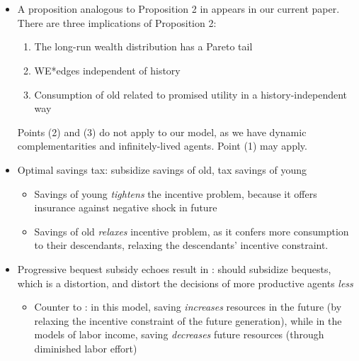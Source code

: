 \documentclass[11pt]{article}
\begin{document}
\section{\cite{shourideh2014optimal}}
\begin{itemize}
    \item A proposition analogous to Proposition 2 in \cite{shourideh2014optimal} appears in our current paper. There are three implications of Proposition 2: 
    \begin{enumerate}
        \item The long-run wealth distribution has a Pareto tail
        \item WE*edges independent of history
        \item Consumption of old related to promised utility in a history-independent way
    \end{enumerate}
    Points (2) and (3) do not apply to our model, as we have dynamic complementarities and infinitely-lived agents. Point (1) may apply. 
    \item Optimal savings tax: subsidize savings of old, tax savings of young 
    \begin{itemize}
        \item Savings of young \textit{tightens} the incentive problem, because it offers insurance against negative shock in future 
        \item Savings of old \textit{relaxes} incentive problem, as it confers more consumption to their descendants, relaxing the descendants' incentive constraint.
    \end{itemize} 
    \item Progressive bequest subsidy echoes result in \cite{farhi2010progressive}: should subsidize bequests, which is a distortion, and distort the decisions of more productive agents \textit{less}
    \begin{itemize}
        \item Counter to \cite{golosov2003optimal}: in this model, saving \textit{increases} resources in the future (by relaxing the incentive constraint of the future generation), while in the models of labor income, saving \textit{decreases} future resources (through diminished labor effort)
    \end{itemize}
\end{itemize}
\end{document}
